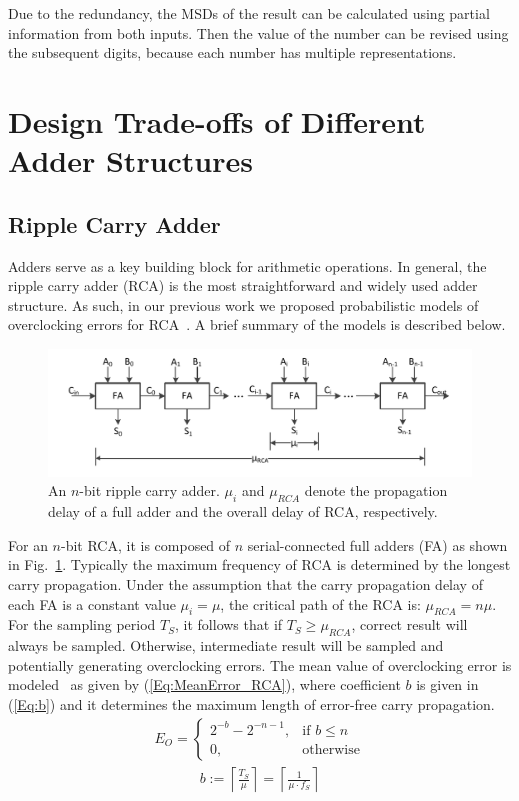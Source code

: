 \documentclass[10pt, conference, compsocconf]{IEEEtran}
\begin{document}
Due to the redundancy, the MSDs of the result can be calculated using partial information from both inputs. Then the value of the number can be revised using the subsequent digits, because each number has multiple representations.

\section{Design Trade-offs of Different Adder Structures}\label{sec:diff_adder}
\subsection{Ripple Carry Adder}\label{subsec:rca}
Adders serve as a key building block for arithmetic operations. In general, the ripple carry adder (RCA) is the most straightforward and widely used adder structure. As such, in our previous work we proposed probabilistic models of overclocking errors for RCA~\cite{SKfccm13}. A brief summary of the models is described below.
%
\begin{figure}[tbp]
  \centering
  \includegraphics[width=.5\textwidth]{./figures/RCA.pdf}
  \vspace{-4ex}
  \caption{An $n$-bit ripple carry adder. $\mu_i$ and $\mu_{RCA}$ denote the propagation delay of a full adder and the overall delay of RCA, respectively.}
  \vspace{-2ex}
  \label{Fig:rca}
\end{figure}

For an $n$-bit RCA, it is composed of $n$ serial-connected full adders (FA) as shown in Fig.~\ref{Fig:rca}. Typically the maximum frequency of RCA is determined by the longest carry propagation. Under the assumption that the carry propagation delay of each FA is a constant value $\mu_i=\mu$, the critical path of the RCA is: $\mu_{RCA}=n\mu$. For the sampling period $T_S$, it follows that if $T_S\geqslant\mu_{RCA}$, correct result will always be sampled. Otherwise, intermediate result will be sampled and potentially generating overclocking errors. The mean value of overclocking error is modeled~\cite{SKfccm13} as given by (\ref{Eq:MeanError_RCA}), where coefficient $b$ is given in (\ref{Eq:b}) and it determines the maximum length of error-free carry propagation.
%
\begin{eqnarray}\label{Eq:MeanError_RCA}
    E_O=\left\{
        \begin{matrix}
            2^{-b}-2^{-n-1}, & \textrm{if $b\leq n$}\\
            0, & \textrm{otherwise}
        \end{matrix}
        \right.
\end{eqnarray}
\vspace{-1.5ex}
%
\begin{eqnarray}\label{Eq:b}
    b:=\left\lceil \frac{T_S}{\mu} \right\rceil=\left\lceil \frac{1}{\mu\cdot f_S}\right\rceil
\end{eqnarray}
\vspace{-1ex}
\normalsize
\end{document}
